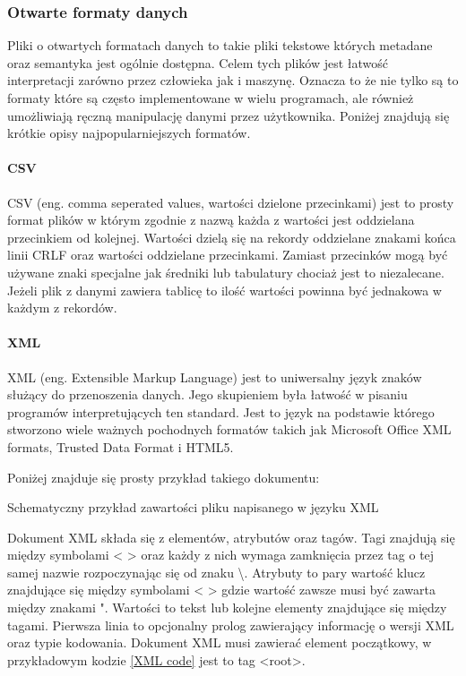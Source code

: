 \subsubsection{Otwarte formaty danych}

Pliki o otwartych formatach danych to takie pliki tekstowe których metadane oraz semantyka jest ogólnie dostępna. 
Celem tych plików jest łatwość interpretacji zarówno przez człowieka jak i maszynę. 
Oznacza to że nie tylko są to formaty które są często implementowane w wielu programach, ale również umożliwiają ręczną manipulację danymi przez użytkownika.  
Poniżej znajdują się krótkie opisy najpopularniejszych formatów.

\paragraph{CSV}
CSV (eng. comma seperated values, wartości dzielone przecinkami) jest to prosty format plików w którym zgodnie z nazwą każda z wartości jest oddzielana przecinkiem od kolejnej. Wartości dzielą się na rekordy oddzielane znakami końca linii CRLF oraz wartości oddzielane przecinkami. Zamiast przecinków mogą być używane znaki specjalne jak średniki lub tabulatury chociaż jest to niezalecane. Jeżeli plik z danymi zawiera tablicę to ilość wartości powinna być jednakowa w każdym z rekordów. 

\paragraph{XML}

XML (eng. Extensible Markup Language) jest to uniwersalny język znaków służący do przenoszenia danych. Jego skupieniem była łatwość w pisaniu programów interpretujących ten standard.
Jest to język na podstawie którego stworzono wiele ważnych pochodnych formatów takich jak Microsoft Office XML formats, Trusted Data Format i HTML5.

Poniżej znajduje się prosty przykład takiego dokumentu:
\begin{kod}
        
        \caption{Schematyczny przykład zawartości pliku napisanego w języku XML}
        \label{XML code}
\end{kod}

Dokument XML składa się z elementów, atrybutów oraz tagów. 
Tagi znajdują się między symbolami < > oraz każdy z nich wymaga zamknięcia przez tag o tej samej nazwie rozpoczynając się od znaku \textbackslash.
Atrybuty to pary wartość klucz znajdujące się między symbolami < > gdzie wartość zawsze musi być zawarta między znakami ".
Wartości to tekst lub kolejne elementy znajdujące się między tagami. 
Pierwsza linia to opcjonalny prolog zawierający informację o wersji XML oraz typie kodowania.  
Dokument XML musi zawierać element początkowy, w przykładowym kodzie \ref{XML code} jest to tag <root>.



